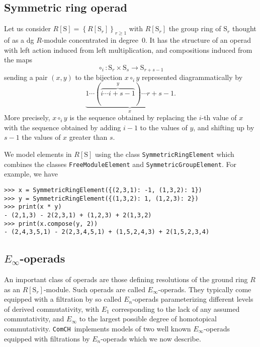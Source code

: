 \documentclass{amsart}
\renewcommand{\S}{\mathrm S}
\newcommand{\comch}{\texttt{ComCH}}
\begin{document}
\subsection{Symmetric ring operad}

Let us consider $R[\S] = \left\{R[\S_r]\right\}_{r \geq 1}$ with $R[\S_r]$ the group ring of $\S_r$ thought of as a dg $R$-module concentrated in degree~$0$. It has the structure of an operad with left action induced from left multiplication, and compositions induced from the maps
\begin{equation} \label{eq: compostion of permutations}
\circ_i \colon \S_r \times \S_s \to \S_{r+s-1}
\end{equation}
sending a pair $(x, y)$ to the bijection $x \circ_i y$ represented diagrammatically by
\begin{equation*}
\underbrace{1 \cdots (\overbrace{i \cdots i+s-1}^y) \cdots r+s-1}_x.
\end{equation*}
More precisely, $x \circ_i y$ is the sequence obtained by replacing the $i$-th value of $x$ with the sequence obtained by adding $i-1$ to the values of $y$, and shifting up by $s-1$ the values of $x$ greater than $s$. 

We model elements in $R[\S]$ using the class \texttt{SymmetricRingElement} which combines the classes \texttt{FreeModuleElement} and \texttt{SymmetricGroupElement}. For example, we have
\begin{verbatim}
>>> x = SymmetricRingElement({(2,3,1): -1, (1,3,2): 1})
>>> y = SymmetricRingElement({(1,3,2): 1, (1,2,3): 2})
>>> print(x * y)
- (2,1,3) - 2(2,3,1) + (1,2,3) + 2(1,3,2)
>>> print(x.compose(y, 2))
- (2,4,3,5,1) - 2(2,3,4,5,1) + (1,5,2,4,3) + 2(1,5,2,3,4)
\end{verbatim}

\subsection{$E_\infty$-operads}

An important class of operads are those defining resolutions of the ground ring $R$ as an $R[\S_r]$-module. Such operads are called \mbox{$E_\infty$-operads}. They typically come equipped with a filtration by so called $E_n$-operads parameterizing different levels of derived commutativity, with $E_1$ corresponding to the lack of any assumed commutativity, and $E_\infty$ to the largest possible degree of homotopical commutativity. \comch\, implements models of two well known $E_\infty$-operads equipped with filtrations by $E_n$-operads which we now describe.
\end{document}
